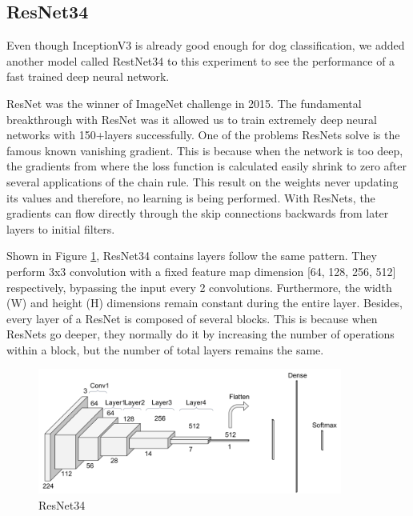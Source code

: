 \documentclass{article}
\begin{document}
\subsection{ResNet34}

Even though InceptionV3 is already good enough for dog classification, we added another model called RestNet34 to this experiment to see the performance of a fast trained deep neural network.

ResNet was the winner of ImageNet challenge in 2015. The fundamental breakthrough with ResNet was it allowed us to train extremely deep neural networks with 150+layers successfully. One of the problems ResNets solve is the famous known vanishing gradient. This is because when the network is too deep, the gradients from where the loss function is calculated easily shrink to zero after several applications of the chain rule. This result on the weights never updating its values and therefore, no learning is being performed. With ResNets, the gradients can flow directly through the skip connections backwards from later layers to initial filters.

 Shown in Figure \ref{fig:resnet}, ResNet34\cite{resnet} contains layers follow the same pattern. They perform 3x3 convolution with a fixed feature map dimension [64, 128, 256, 512] respectively, bypassing the input every 2 convolutions. Furthermore, the width (W) and height (H) dimensions remain constant during the entire layer. Besides, every layer of a ResNet is composed of several blocks. This is because when ResNets go deeper, they normally do it by increasing the number of operations within a block, but the number of total layers remains the same.


 \begin{figure}[h!]
    \centering
    \includegraphics[width=10cm]{restnet34.png}
    \caption{ResNet34}
    \label{fig:resnet}
\end{figure}
    
\end{document}
